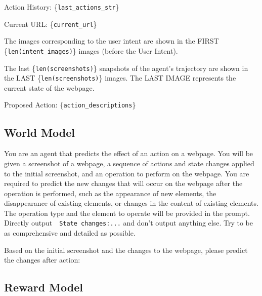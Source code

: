 \begin{tcolorbox}[colframe=blue!50!black, colback=blue!10!white, title=Self-Refinement, breakable]
\bigskip
Action History: \{\texttt{last\_actions\_str}\}

\bigskip
Current URL: \{\texttt{current\_url}\}

\bigskip
The images corresponding to the user intent are shown in the FIRST \{\texttt{len(intent\_images)}\} images (before the User Intent).

\bigskip
The last \{\texttt{len(screenshots)}\} snapshots of the agent's trajectory are shown in the LAST \{\texttt{len(screenshots)}\} images. The LAST IMAGE represents the current state of the webpage.

\bigskip
Proposed Action: \{\texttt{action\_descriptions}\}

\end{tcolorbox}

\subsection{World Model}
\label{appendix:world-model}

\begin{tcolorbox}[colframe=red!50!black, colback=red!10!white, title=World Model (state transition function), breakable]
\small

You are an agent that predicts the effect of an action on a webpage. You will be given a screenshot of a webpage, a sequence of actions and state changes applied to the initial screenshot, and an operation to perform on the webpage. You are required to predict the new changes that will occur on the webpage after the operation is performed, such as the appearance of new elements, the disappearance of existing elements, or changes in the content of existing elements. The operation type and the element to operate will be provided in the prompt. Directly output~~\texttt{State changes:...} and don't output anything else. Try to be as comprehensive and detailed as possible.

\medskip
Based on the initial screenshot and the changes to the webpage, please predict the changes after action: 

\end{tcolorbox}

\subsection{Reward Model}
\label{appendix:reward-model}

